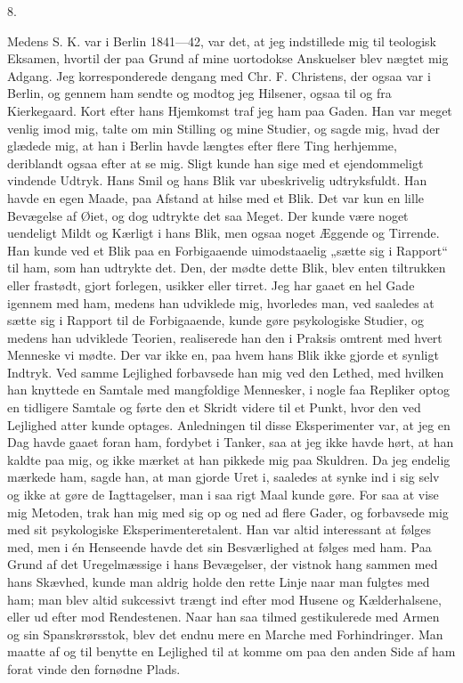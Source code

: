 \documentclass[12pt,a4paper,openany]{book}
\newcommand{\secnum}[1]{\par\begin{center}#1\end{center}\par\nobreak}
\newcommand{\opage}[1]{\marginnote{\footnotesize\textit{[#1]}}}
\begin{document}
\secnum{8.}

Medens S. K. var i Berlin 1841---42, var det, at jeg
indstillede mig til teologisk Eksamen, hvortil der paa Grund
af mine uortodokse Anskuelser blev nægtet mig Adgang.
Jeg korresponderede dengang med Chr. F. Christens, der
ogsaa var i Berlin, og gennem ham sendte og modtog
jeg Hilsener, ogsaa til og fra Kierkegaard. Kort efter
hans Hjemkomst traf jeg ham paa Gaden. Han var
\opage{343}meget venlig imod mig, talte om min Stilling og mine
Studier, og sagde mig, hvad der glædede mig, at han i
Berlin havde længtes efter flere Ting herhjemme, deriblandt
ogsaa efter at se mig. Sligt kunde han sige med
et ejendommeligt vindende Udtryk. Hans Smil og hans
Blik var ubeskrivelig udtryksfuldt. Han havde en egen
Maade, paa Afstand at hilse med et Blik. Det var kun
en lille Bevægelse af Øiet, og dog udtrykte det saa Meget.
Der kunde være noget uendeligt Mildt og Kærligt i hans
Blik, men ogsaa noget Æggende og Tirrende. Han kunde
ved et Blik paa en Forbigaaende uimodstaaelig „sætte
sig i Rapport“ til ham, som han udtrykte det. Den, der
mødte dette Blik, blev enten tiltrukken eller frastødt,
gjort forlegen, usikker eller tirret. Jeg har gaaet en
hel Gade igennem med ham, medens han udviklede mig,
hvorledes man, ved saaledes at sætte sig i Rapport til
de Forbigaaende, kunde gøre psykologiske Studier, og
medens han udviklede Teorien, realiserede han den i
Praksis omtrent med hvert Menneske vi mødte. Der
var ikke en, paa hvem hans Blik ikke gjorde et synligt
Indtryk. Ved samme Lejlighed forbavsede han mig ved
den Lethed, med hvilken han knyttede en Samtale med
mangfoldige Mennesker, i nogle faa Repliker optog en
tidligere Samtale og førte den et Skridt videre til et
Punkt, hvor den ved Lejlighed atter kunde optages.
Anledningen til disse Eksperimenter var, at jeg en Dag
havde gaaet foran ham, fordybet i Tanker, saa at jeg
ikke havde hørt, at han kaldte paa mig, og ikke mærket
at han pikkede mig paa Skuldren. Da jeg endelig mærkede
ham, sagde han, at man gjorde Uret i, saaledes at synke
ind i sig selv og ikke at gøre de Iagttagelser, man i
saa rigt Maal kunde gøre. For saa at vise mig Metoden,
trak han mig med sig op og ned ad flere Gader, og forbavsede
mig med sit psykologiske Eksperimenteretalent.
Han var altid interessant at følges med, men i én Henseende
havde det sin Besværlighed at følges med ham.
\opage{344}Paa Grund af det Uregelmæssige i hans Bevægelser, der
vistnok hang sammen med hans Skævhed, kunde man
aldrig holde den rette Linje naar man fulgtes med ham;
man blev altid sukcessivt trængt ind efter mod Husene
og Kælderhalsene, eller ud efter mod Rendestenen. Naar
han saa tilmed gestikulerede med Armen og sin Spanskrørsstok,
blev det endnu mere en Marche med Forhindringer.
Man maatte af og til benytte en Lejlighed til
at komme om paa den anden Side af ham forat vinde
den fornødne Plads.
\end{document}
